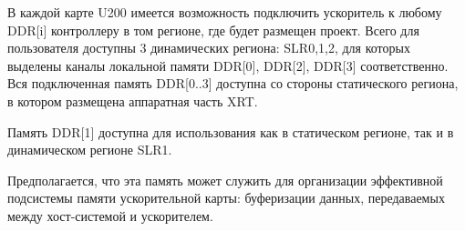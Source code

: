 В каждой карте U200 имеется возможность подключить ускоритель к любому DDR[i] контроллеру в том регионе, где будет размещен проект. Всего для пользователя доступны 3 динамических региона: SLR0,1,2, для которых выделены каналы локальной памяти DDR[0], DDR[2], DDR[3] соответственно. Вся подключенная память DDR[0..3] доступна со стороны статического региона, в котором размещена аппаратная часть XRT.

Память DDR[1] доступна для использования как в статическом регионе, так и в динамическом регионе SLR1.

Предполагается, что эта память может служить для организации эффективной подсистемы памяти ускорительной карты: буферизации данных, передаваемых между хост-системой и ускорителем.
